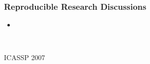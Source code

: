 \begin{frame}
 \frametitle{Reproducible Research Discussions}

\begin{itemize}
\item {}
\end{itemize}

  \begin{minipage}{0.3\textwidth}
  \begin{center}
  \vfill \ 
\end{center}
  \end{minipage} \hfill
   \begin{minipage}{0.65\textwidth}
  \begin{description}
    \item[ICASSP 2007] \ 

\end{description}
\end{minipage}
\end{frame}

